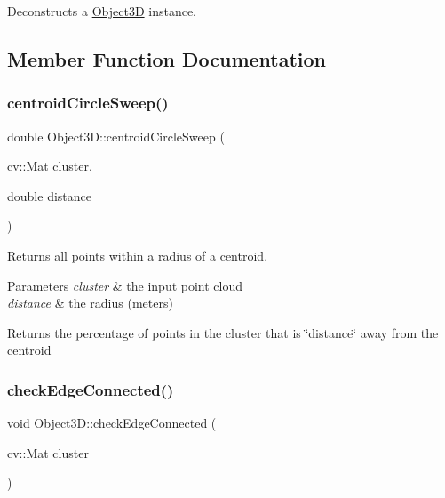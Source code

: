 Deconstructs a \hyperlink{class_object3_d}{Object3D} instance. 



\subsection{Member Function Documentation}
\hypertarget{class_object3_d_abc610dabb1f32b90702ff2418bd949b3}{}\label{class_object3_d_abc610dabb1f32b90702ff2418bd949b3} 
\subsubsection{\texorpdfstring{centroid\+Circle\+Sweep()}{centroidCircleSweep()}}
{\footnotesize\ttfamily double Object3\+D\+::centroid\+Circle\+Sweep (\begin{DoxyParamCaption}\item[{cv\+::\+Mat}]{cluster,  }\item[{double}]{distance }\end{DoxyParamCaption})\hspace{0.3cm}{\ttfamily [private]}}



Returns all points within a radius of a centroid. 


\begin{DoxyParams}{Parameters}
{\em cluster} & the input point cloud \\
\hline
{\em distance} & the radius (meters) \\
\hline
\end{DoxyParams}
\begin{DoxyReturn}{Returns}
the percentage of points in the cluster that is \char`\"{}distance\char`\"{} away from the centroid 
\end{DoxyReturn}
\hypertarget{class_object3_d_a9da221ef5e29107d54f0ee050ee267d3}{}\label{class_object3_d_a9da221ef5e29107d54f0ee050ee267d3} 
\subsubsection{\texorpdfstring{check\+Edge\+Connected()}{checkEdgeConnected()}}
{\footnotesize\ttfamily void Object3\+D\+::check\+Edge\+Connected (\begin{DoxyParamCaption}\item[{cv\+::\+Mat}]{cluster }\end{DoxyParamCaption})\hspace{0.3cm}{\ttfamily [private]}}



